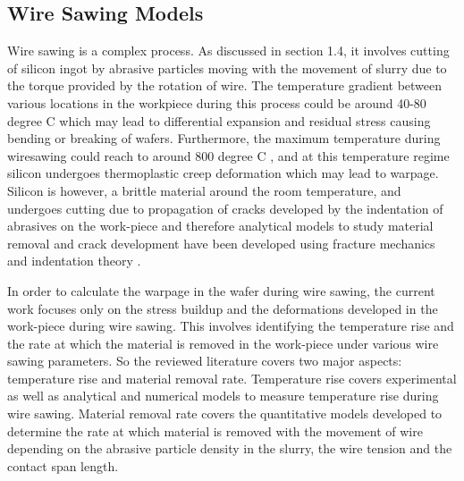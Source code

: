 \subsection{Wire Sawing Models}
Wire sawing is a complex process. As discussed in section 1.4, it involves cutting of silicon ingot by abrasive particles moving with the movement of slurry due to the torque provided by the rotation of wire. The temperature gradient between various locations in the workpiece during this process could be around 40-80 degree C \cite{} which may lead to differential expansion and residual stress causing bending or breaking of wafers. Furthermore, the maximum temperature during wiresawing could reach to around 800 degree C \cite{}, and at this temperature regime silicon undergoes thermoplastic creep deformation which may lead to warpage. Silicon is however, a brittle material around the room temperature, and undergoes cutting due to propagation of cracks developed by the indentation of abrasives on the work-piece and therefore analytical models to study material removal and crack development have been developed using fracture mechanics and indentation theory \cite{}.

In order to calculate the warpage in the wafer during wire sawing, the current work focuses only on the stress buildup and the deformations developed in the work-piece during wire sawing. This involves identifying the temperature rise and the rate at which the material is removed in the work-piece under various wire sawing parameters. So the reviewed literature covers two major aspects: temperature rise and  material removal rate. Temperature rise covers experimental \cite{citation from bhagwat} as well as analytical \cite{swis guy} and numerical \cite{bhagwat} models to measure temperature rise during wire sawing. Material removal rate covers the quantitative models developed to determine the rate at which material is removed with the movement of wire depending on the abrasive particle density in the slurry, the wire tension and the contact span length. 



